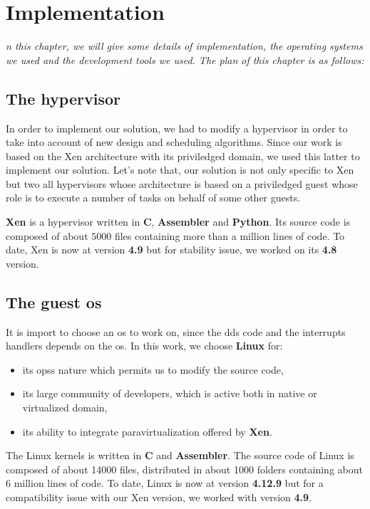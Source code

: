 \chapter{Implementation}
\label{chap:implem}
\textit{n this chapter, we will give some details of implementation, the operating systems we used and the development tools we used. The plan of this chapter is as follows:
}

\minitoc

\section{The hypervisor}

In order to implement our solution, we had to modify a hypervisor in order to take into account of new design and scheduling algorithms. Since our work is based on the Xen architecture with its priviledged domain, we used this latter to implement our solution. Let's note that, our solution is not only specific to Xen but two all hypervisors whose architecture is based on a priviledged guest whose role is to execute a number of tasks on behalf of some other guests. 

\textbf{Xen} is a hypervisor written in \textbf{C}, \textbf{Assembler} and \textbf{Python}. Its source code is composed of about $5000$ files containing more than a million lines of code. To date, Xen is now at version \textbf{4.9} but for stability issue, we worked on its \textbf{4.8} version.

\section{The guest \acrshort{os}}
It is import to choose an \acrshort{os} to work on, since the \glspl{dd} code and the \glspl{interrupt} handlers depends on the \acrshort{os}. In this work, we choose \textbf{Linux} for: 

\begin{itemize}
	\item its \glspl{ops} nature which permits us to modify the source code,
    \item its large community of developers, which is active both in native or virtualized domain,
    \item its ability to integrate paravirtualization offered by \textbf{Xen}.
\end{itemize}

The Linux \glspl{kernel} is written in \textbf{C} and \textbf{Assembler}. The source code of Linux is composed of about 14000 files, distributed in about 1000 folders containing about 6 million lines of code. To date, Linux is now at version \textbf{4.12.9} but for a compatibility issue with our Xen version, we worked with version \textbf{4.9}.


